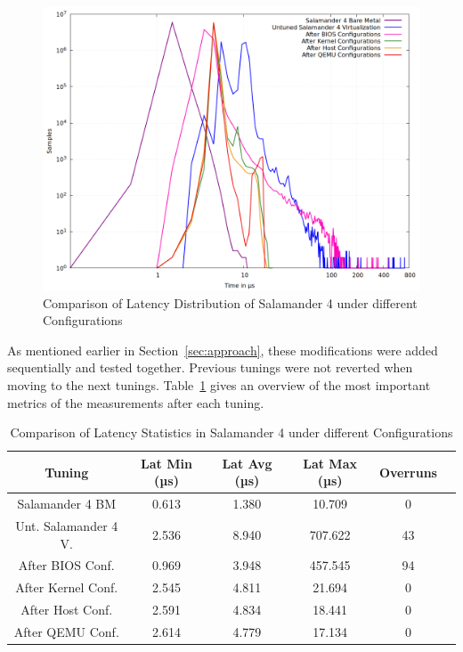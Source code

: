 \documentclass[MMR,Master,english]{twbook}
\begin{document}
\begin{figure}[H]
	\centering
	\includegraphics[width=0.70\columnwidth]{masterthesis-documentation/docs/sigmatek/xenomai/012456combined/gnuplot_combined_max_latency.png}
	\caption[Comparison of Latency Distribution of Salamander 4 Configurations]{Comparison of Latency Distribution of Salamander 4 under different Configurations}
	\label{fig:max_latency_combined_results}
\end{figure}

\noindent As mentioned earlier in Section~\ref{sec:approach}, these modifications were added sequentially and tested together. Previous tunings were not reverted when moving to the next tunings. Table~\ref{tab:latency_tables_combined} gives an overview of the most important metrics of the measurements after each tuning. 

\begin{table}[H]
	\centering
	\footnotesize
	\caption{Comparison of Latency Statistics in Salamander 4 under different Configurations}
	\label{tab:latency_tables_combined}
	\begin{tabular}{|c|c|c|c|c|c|}
		\hline
		\textbf{Tuning} & \textbf{Lat Min (µs)} & \textbf{Lat Avg (µs)} & \textbf{Lat Max (µs)} & \textbf{Overruns} \\ \hline
		Salamander 4 BM        & 0.613                 & 1.380                 & 10.709            & 0                 \\ \hline
		Unt. Salamander 4 V.        & 2.536                 & 8.940                 & 707.622      & 43                \\ \hline
		After BIOS Conf.   & 0.969                 & 3.948                 & 457.545               & 94                \\ \hline
		After Kernel Conf. & 2.545                 & 4.811                 & 21.694                & 0                 \\ \hline
		After Host Conf.   & 2.591                 & 4.834                 & 18.441                & 0                 \\ \hline
		After QEMU Conf.   & 2.614                 & 4.779                 & 17.134                & 0                 \\ \hline
	\end{tabular}
\end{table}
\end{document}
